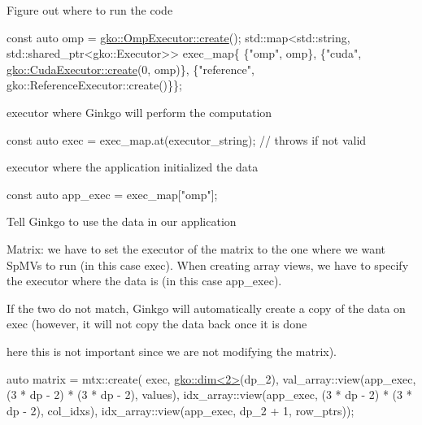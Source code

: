 Figure out where to run the code


\begin{DoxyCode}
\textcolor{keyword}{const} \textcolor{keyword}{auto} omp = \hyperlink{classgko_1_1OmpExecutor_a33ca05fdd0fc928ee262fc9425304874}{gko::OmpExecutor::create}();
std::map<std::string, std::shared\_ptr<gko::Executor>> exec\_map\{
    \{\textcolor{stringliteral}{"omp"}, omp\},
    \{\textcolor{stringliteral}{"cuda"}, \hyperlink{classgko_1_1CudaExecutor_a2718a92034350650ef406ffdb60db090}{gko::CudaExecutor::create}(0, omp)\},
    \{\textcolor{stringliteral}{"reference"}, gko::ReferenceExecutor::create()\}\};
\end{DoxyCode}


executor where Ginkgo will perform the computation


\begin{DoxyCode}
\textcolor{keyword}{const} \textcolor{keyword}{auto} exec = exec\_map.at(executor\_string);  \textcolor{comment}{// throws if not valid}
\end{DoxyCode}


executor where the application initialized the data


\begin{DoxyCode}
\textcolor{keyword}{const} \textcolor{keyword}{auto} app\_exec = exec\_map[\textcolor{stringliteral}{"omp"}];
\end{DoxyCode}


Tell Ginkgo to use the data in our application

Matrix\+: we have to set the executor of the matrix to the one where we want Sp\+M\+Vs to run (in this case {\ttfamily exec}). When creating array views, we have to specify the executor where the data is (in this case {\ttfamily app\+\_\+exec}).

If the two do not match, Ginkgo will automatically create a copy of the data on {\ttfamily exec} (however, it will not copy the data back once it is done
\begin{DoxyItemize}
\item here this is not important since we are not modifying the matrix).
\end{DoxyItemize}


\begin{DoxyCode}
\textcolor{keyword}{auto} matrix = mtx::create(
    exec, \hyperlink{structgko_1_1dim}{gko::dim<2>}(dp\_2),
    val\_array::view(app\_exec, (3 * dp - 2) * (3 * dp - 2), values),
    idx\_array::view(app\_exec, (3 * dp - 2) * (3 * dp - 2), col\_idxs),
    idx\_array::view(app\_exec, dp\_2 + 1, row\_ptrs));
\end{DoxyCode}


